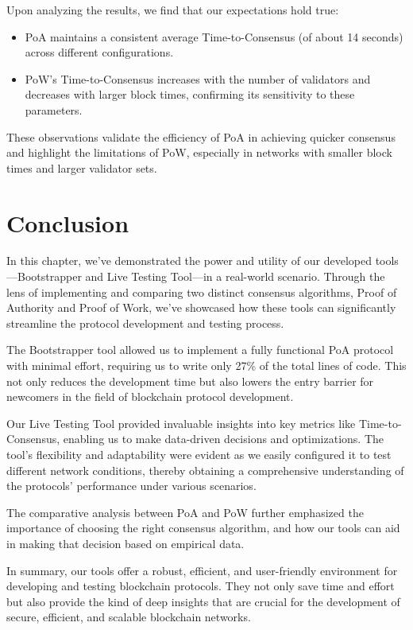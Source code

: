 Upon analyzing the results, we find that our expectations hold true:

\begin{itemize}
    \item PoA maintains a consistent average Time-to-Consensus (of about 14 seconds) across different configurations.
    \item PoW's Time-to-Consensus increases with the number of validators and decreases with larger block times, confirming its sensitivity to these parameters.
\end{itemize}

These observations validate the efficiency of PoA in achieving quicker consensus and highlight the limitations of PoW, especially in networks with smaller block times and larger validator sets.


\section{Conclusion}

In this chapter, we've demonstrated the power and utility of our developed tools—Bootstrapper and Live Testing Tool—in a real-world scenario. Through the lens of implementing and comparing two distinct consensus algorithms, Proof of Authority and Proof of Work, we've showcased how these tools can significantly streamline the protocol development and testing process.

The Bootstrapper tool allowed us to implement a fully functional PoA protocol with minimal effort, requiring us to write only 27\% of the total lines of code. This not only reduces the development time but also lowers the entry barrier for newcomers in the field of blockchain protocol development.

Our Live Testing Tool provided invaluable insights into key metrics like Time-to-Consensus, enabling us to make data-driven decisions and optimizations. The tool's flexibility and adaptability were evident as we easily configured it to test different network conditions, thereby obtaining a comprehensive understanding of the protocols' performance under various scenarios.

The comparative analysis between PoA and PoW further emphasized the importance of choosing the right consensus algorithm, and how our tools can aid in making that decision based on empirical data.

In summary, our tools offer a robust, efficient, and user-friendly environment for developing and testing blockchain protocols. They not only save time and effort but also provide the kind of deep insights that are crucial for the development of secure, efficient, and scalable blockchain networks.

